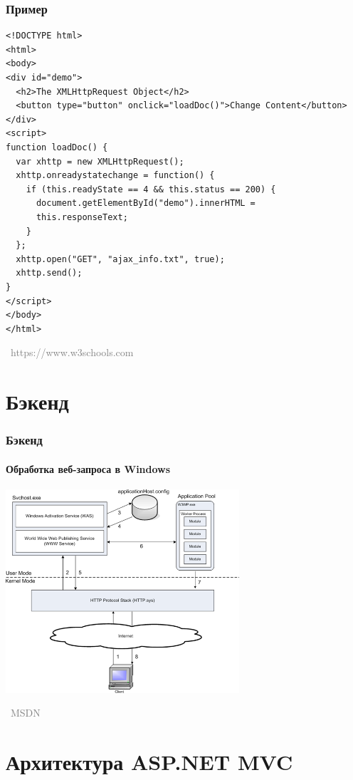 \documentclass[xetex,mathserif,serif]{beamer}
\newcommand{\attribution}[1] {
\vspace{-5mm}\begin{flushright}\begin{scriptsize}\textcolor{gray}{\textcopyright\, #1}\end{scriptsize}\end{flushright}
}
\begin{document}
	\begin{frame}[fragile]
		\frametitle{Пример}
		\begin{scriptsize}
			\begin{verbatim}
<!DOCTYPE html>
<html>
<body>
<div id="demo">
  <h2>The XMLHttpRequest Object</h2>
  <button type="button" onclick="loadDoc()">Change Content</button>
</div>
<script>
function loadDoc() {
  var xhttp = new XMLHttpRequest();
  xhttp.onreadystatechange = function() {
    if (this.readyState == 4 && this.status == 200) {
      document.getElementById("demo").innerHTML =
      this.responseText;
    }
  };
  xhttp.open("GET", "ajax_info.txt", true);
  xhttp.send();
}
</script>
</body>
</html>
			\end{verbatim}
		\end{scriptsize}
		\vspace{-3mm}
		\attribution{https://www.w3schools.com}
	\end{frame}

	\section{Бэкенд}

	\begin{frame}
		\frametitle{Бэкенд}
		\framesubtitle{Обработка веб-запроса в Windows}
		\begin{center}
			\includegraphics[width=0.65\textwidth]{requestProcessing.png}
			\vspace{-5mm}
			\attribution{MSDN}
		\end{center}
	\end{frame}

	\section{Архитектура ASP.NET MVC}
\end{document}
